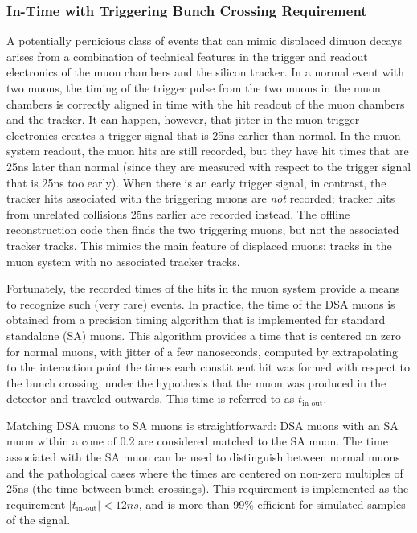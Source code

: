 \subsubsection{In-Time with Triggering Bunch Crossing Requirement}
\label{sec:dd:timing}
A potentially pernicious class of events that can mimic displaced dimuon decays arises from a combination of technical features in the trigger and readout electronics of the muon chambers and the silicon tracker.
In a normal event with two muons, the timing of the trigger pulse from the two muons in the muon chambers is correctly aligned in time with the hit readout of the muon chambers and the tracker.
It can happen, however, that jitter in the muon trigger electronics creates a \Lone trigger signal that is 25\unit{ns} earlier than normal.
In the muon system readout, the muon hits are still recorded, but they have hit times that are 25\unit{ns} later than normal (since they are measured with respect to the \Lone trigger signal that is 25\unit{ns} too early).
When there is an early \Lone trigger signal, in contrast, the tracker hits associated with the triggering muons are \emph{not} recorded; tracker hits from unrelated \pp collisions 25\unit{ns} earlier are recorded instead.
The offline reconstruction code then finds the two triggering muons, but not the associated tracker tracks.
This mimics the main feature of displaced muons: tracks in the muon system with no associated tracker tracks.

Fortunately, the recorded times of the hits in the muon system provide a means to recognize such (very rare) events.
In practice, the time of the DSA muons is obtained from a precision timing algorithm that is implemented for standard standalone (SA) muons.
This algorithm provides a time that is centered on zero for normal muons, with jitter of a few nanoseconds, computed by extrapolating to the interaction point the times each constituent hit was formed with respect to the bunch crossing, under the hypothesis that the muon was produced in the detector and traveled outwards.
This time is referred to as $t_\text{in-out}$.

Matching DSA muons to SA muons is straightforward: DSA muons with an SA muon within a \deltaR cone of 0.2 are considered matched to the SA muon.
The time associated with the SA muon can be used to distinguish between normal muons and the pathological cases where the times are centered on non-zero multiples of 25\unit{ns} (the time between bunch crossings).
This requirement is implemented as the requirement $|t_\text{in-out}| < 12\unit{ns}$, and is more than 99\% efficient for simulated samples of the \twoMu signal.

